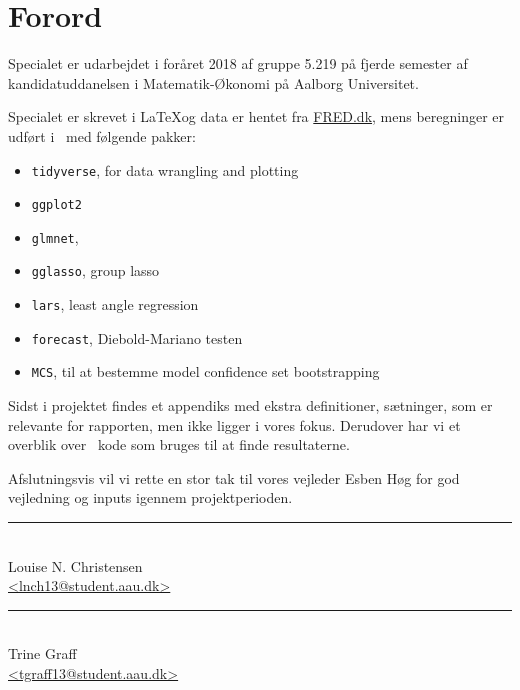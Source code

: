 \chapter{Forord} \label{ch:forord}
Specialet er udarbejdet i foråret 2018 af gruppe 5.219 på fjerde semester af kandidatuddanelsen i Matematik-Økonomi på Aalborg Universitet.

Specialet er skrevet i \LaTeX og data er hentet fra \url{FRED.dk}, mens beregninger er udført i \Rlang ~med følgende pakker:
%
\begin{itemize}
	\item \texttt{tidyverse}, for data wrangling and plotting
	\item \texttt{ggplot2}
	\item \texttt{glmnet}, 
	\item \texttt{gglasso}, group lasso
	\item \texttt{lars}, least angle regression
	\item \texttt{forecast}, Diebold-Mariano testen
	\item \texttt{MCS}, til at bestemme model confidence set bootstrapping
\end{itemize}
%
Sidst i projektet findes et appendiks med ekstra definitioner, sætninger, som er relevante for rapporten, men ikke ligger i vores fokus.
Derudover har vi et overblik over \Rlang ~kode som bruges til at finde resultaterne. 

Afslutningsvis vil vi rette en stor tak til vores vejleder Esben Høg for god vejledning og inputs igennem projektperioden.

%
%
\vfill
%

\begin{center}
\begin{minipage}[b]{0.45\textwidth}
 \centering
 \rule{\textwidth}{0.5pt}\\
  Louise N. Christensen\\
 {\footnotesize\ttfamily \href{mailto:lnch13@student.aau.dk}{<lnch13@student.aau.dk>}}
\end{minipage}
\hfill
\begin{minipage}[b]{0.45\textwidth}
 \centering
 \rule{\textwidth}{0.5pt}\\
  Trine Graff\\
 {\footnotesize\ttfamily \href{mailto:tgraff13@student.aau.dk}{<tgraff13@student.aau.dk>}}
\end{minipage}
\end{center}

